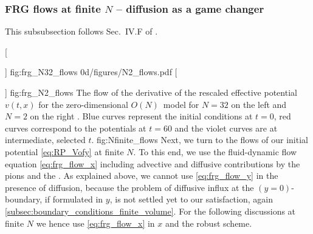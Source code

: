 \subsubsection{FRG flows at finite \texorpdfstring{$N$}{N} -- diffusion as a game changer}\label{subsubsec:FRGlargeNfin}
\begin{disclaimer}
	This subsubsection follows Sec.~IV.F of .
\end{disclaimer}
	[\caption{\frg{} flow with $N = 32$ for the \ic{}~\eqref{eq:RP_vofx} with $a = 0$, $a = a_\mathrm{c}$, and $a = 2 a_\mathrm{c}$ in the upper, middle, and lower panel respectively.}]%
	{fig:frg_N32_flows}%
	{0d/figures/N2_flows.pdf}%
	[\caption{\frg{} flow with $N = 2$ for the \ic{}~\eqref{eq:RP_vofx} with $a = 0$, $a = a_\mathrm{c}$, and $a = 2 a_\mathrm{c}$ in the upper, middle, and lower panel respectively.}]%
	{fig:frg_N2_flows}%
	{%
		The \frg{} flow of the derivative of the rescaled effective potential $v ( t, x )$ for the zero-dimensional $O(N)$~model for $N=32$ on the left  and $N=2$ on the right .
		{Blue} curves represent the \uv{} initial conditions at $t = 0$, {red} curves correspond to the \ir{} potentials at $t = 60$ and the {violet} curves are at intermediate, selected \rgtimes{} $t$.
	}%
	{fig:Nfinite_flows}%
Next, we turn to the \frg{} flows of our initial potential \eqref{eq:RP_Vofy} at finite $N$.
To this end, we use the fluid-dynamic \frg{} flow equation \eqref{eq:frg_flow_x} including advective and diffusive contributions by the pions and the \sigmaMode{}.
As explained above, we cannot use \cref{eq:frg_flow_y} in the presence of diffusion, because the problem of diffusive influx at the $(y = 0)$-boundary, if formulated in $y$, is not settled yet to our satisfaction, \cf{} again \cref{subsec:boundary_conditions_finite_volume}.
For the following discussions at finite $N$ we hence use \cref{eq:frg_flow_x} in $x$ and the robust \kt{} scheme.
	
